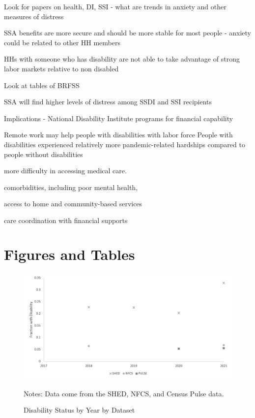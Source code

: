 \documentclass[12pt]{article}
\begin{document}
Look for papers on health, DI, SSI - what are trends in anxiety and other measures of distress

SSA benefits are more secure and should  be more stable for most people  - anxiety could be related to other HH members

HHs with someone who has disability are not able to take advantage of strong labor markets relative to non disabled

Look at tables of BRFSS

\cite{blanchflower2022covid}

SSA will find higher levels of distress among SSDI and SSI recipients 

Implications - National Disability Institute programs for financial capability


\cite{kruse2022disability}
Remote work may help people with disabilities with labor force
People with disabilities experienced relatively more pandemic-related hardships compared to people without disabilities

more difficulty in accessing medical care.

comorbidities, including poor mental health,

access to home and community-based services 

 care coordination  with financial supports
 
 \cite{mitra2022advancing}
 

\section{Figures and Tables}


 \begin{figure}[h!]\label{Disability}
\caption{Disability Status by Year by Dataset}
\centering
\includegraphics[scale=0.8]{Exhibits/Picture1.png}
\medskip 
\begin{minipage}{0.65\textwidth} 
{\footnotesize Notes: Data come from the SHED, NFCS, and Census Pulse data.  \par}
\end{minipage}
\end{figure}
 
\end{document}
